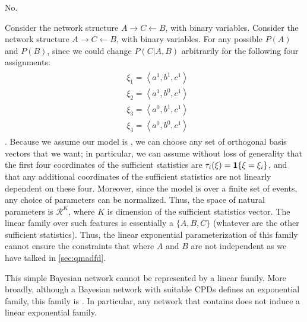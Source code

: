 \documentclass{article}
\begin{document}
 No.
\begin{exma}\label{ex:mndfafda}
Consider the network structure $A \rightarrow C \leftarrow B$, with binary variables.  Consider the network structure $A \rightarrow C \leftarrow B$, with binary variables. For any possible $P(A)$ and $P(B)$, since we could change $P(C|A,B)$ arbitrarily for the following four assignments:
\begin{align*}
\begin{aligned}
&\xi_{1}=\left\langle a^{1}, b^{1}, c^{1}\right\rangle \\
&\xi_{2}=\left\langle a^{1}, b^{0}, c^{1}\right\rangle \\
&\xi_{3}=\left\langle a^{0}, b^{1}, c^{1}\right\rangle \\
&\xi_{4}=\left\langle a^{0}, b^{0}, c^{1}\right\rangle
\end{aligned}
\end{align*}
. Because we assume our model is , we can choose any set of orthogonal basis vectors that we want; in particular, we can assume without loss of generality that the first four coordinates of the sufficient statistics are $\tau_{i}(\xi)=\indicate{\xi=\xi_{i}}$, and that any additional coordinates of the sufficient statistics are not linearly dependent on these four. Moreover, since the model is over a finite set of events, any choice of parameters can be normalized. Thus, the space of natural parameters is $\mathcal{R}^{K}$, where $K$ is dimension of the sufficient statistics vector. The linear family over such features is essentially a  $\{A, B, C\}$ (whatever are the other sufficient statistics). Thus, the linear exponential parameterization of this family cannot ensure the constraints that where $A$ and $B$ are not independent as we have talked in \cref{sec:qmadfd}.
\end{exma}

This simple Bayesian network cannot be represented by a linear family. More broadly, although a Bayesian network with suitable CPDs defines an exponential family, this family is . In particular, any network that contains  does not induce a linear exponential family.
\end{document}
